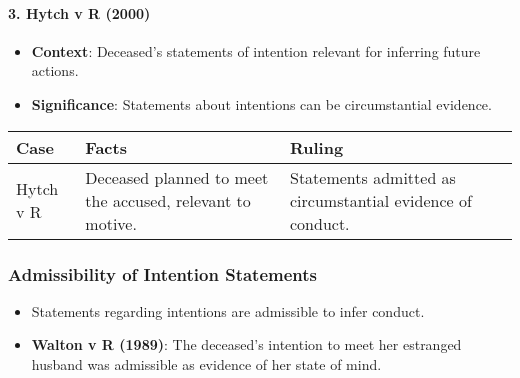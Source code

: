 \paragraph{3. Hytch v R (2000)}\label{hytch-v-r-2000}

\begin{itemize}
\tightlist
\item
  \textbf{Context}: Deceased's statements of intention relevant for
  inferring future actions.
\item
  \textbf{Significance}: Statements about intentions can be
  circumstantial evidence.
\end{itemize}

\begin{longtable}[]{@{}
  >{\raggedright\arraybackslash}p{}
  >{\raggedright\arraybackslash}p{}
  >{\raggedright\arraybackslash}p{}@{}}
\toprule\noalign{}
\begin{minipage}[b]{\linewidth}\raggedright
Case
\end{minipage} & \begin{minipage}[b]{\linewidth}\raggedright
Facts
\end{minipage} & \begin{minipage}[b]{\linewidth}\raggedright
Ruling
\end{minipage} \\
\midrule\noalign{}
\endhead
\bottomrule\noalign{}
\endlastfoot
Hytch v R & Deceased planned to meet the accused, relevant to motive. &
Statements admitted as circumstantial evidence of conduct. \\
\end{longtable}

\subsubsection{Admissibility of Intention
Statements}\label{admissibility-of-intention-statements}

\begin{itemize}
\tightlist
\item
  Statements regarding intentions are admissible to infer conduct.
\item
  \textbf{Walton v R (1989)}: The deceased's intention to meet her
  estranged husband was admissible as evidence of her state of mind.
\end{itemize}

